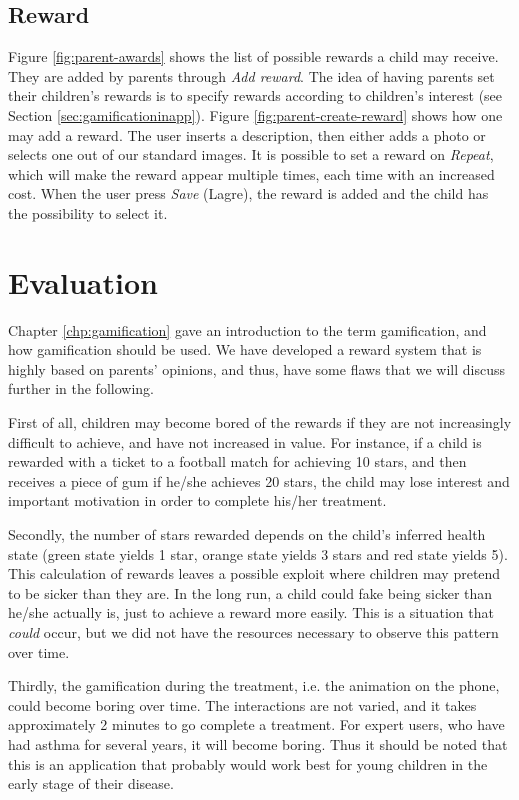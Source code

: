 \subsection{Reward}
\label{sec:description-manage-rewards}
Figure \ref{fig:parent-awards} shows the list of possible rewards a child may receive. They are added by parents through \emph{Add reward}. The idea of having parents set their children's rewards is to specify rewards according to children's interest (see Section \ref{sec:gamificationinapp}). Figure \ref{fig:parent-create-reward} shows how one may add a reward. The user inserts a description, then either adds a photo or selects one out of our standard images. It is possible to set a reward on \emph{Repeat}, which will make the reward appear multiple times, each time with an increased cost.        
When the user press \emph{Save} (Lagre), the reward is added and the child has the possibility to select it. 
 

 
\section{Evaluation}
\label{sec:asthmappevaluation}
Chapter \ref{chp:gamification} gave an introduction to the term gamification, and how gamification should be used. We have developed a reward system that is highly based on parents' opinions, and thus, have some flaws that we will discuss further in the following. 

First of all, children may become bored of the rewards if they are not increasingly difficult to achieve, and have not increased in value. For instance, if a child is rewarded with a ticket to a football match for achieving 10 stars, and then receives a piece of gum if he/she achieves 20 stars, the child may lose interest and important motivation in order to complete his/her treatment. 

Secondly, the number of stars rewarded depends on the child's inferred health state (green state yields 1 star, orange state yields 3 stars and red state yields 5). This calculation of rewards leaves a possible exploit where children may pretend to be sicker than they are. In the long run, a child could fake being sicker than he/she actually is, just to achieve a reward more easily. This is a situation that \emph{could} occur, but we did not have the resources necessary to observe this pattern over time.

Thirdly, the gamification during the treatment, i.e. the animation on the phone, could become boring over time. 
The interactions are not varied, and it takes approximately 2 minutes to go complete a treatment. For expert users, who have had asthma for several years, it will become boring. Thus it should be noted that this is an application that probably would work best for young children in the early stage of their disease.      

